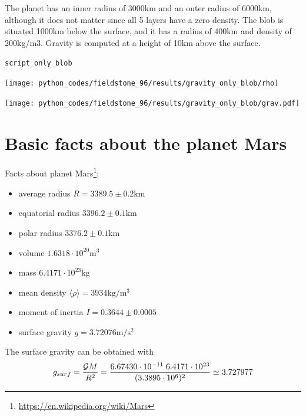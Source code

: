 The planet has an inner radius of 3000km and an outer radius of 6000km,
although it does not matter since all 5 layers have a zero density. 
The blob is situated 1000km below the surface, and it has a radius of 400km and density of 200kg/m3.
Gravity is computed at a height of 10km above the surface.

{\tt script\_only\_blob}

\begin{center}
\texttt{[image: python\_codes/fieldstone\_96/results/gravity\_only\_blob/rho]}
\end{center}

\begin{center}
\texttt{[image: python\_codes/fieldstone\_96/results/gravity\_only\_blob/grav.pdf]}
\end{center}













\newpage
\section*{Basic facts about the planet Mars}

Facts about planet Mars\footnote{\url{https://en.wikipedia.org/wiki/Mars}}:
\begin{itemize}
\item average radius $R=3389.5 \pm 0.2 \si{\km}$
\item equatorial radius $3396.2 \pm 0.1 \si{\km}$
\item polar radius $3376.2 \pm 0.1 \si{\km}$
\item volume $1.6318 \cdot 10^{20} \si{\cubic\metre}$
\item mass $6.4171 \cdot 10^{23}\si{\kilo\gram}$
\item mean density $\langle\rho\rangle= 3934\si{\kilo\gram\per\cubic\meter}$
\item moment of inertia $I=0.3644 \pm 0.0005$
\item surface gravity $g=3.72076 \si{\metre\per\square\second}$
\end{itemize}

The surface gravity can be obtained with 
\[
g_{surf}=\frac{{\cal G} M}{R^2} 
=\frac{6.67430 \cdot 10^{-11} \; 6.4171 \cdot 10^{23} }{(3.3895\cdot 10^6)^2}
\simeq 3.727977
\]

